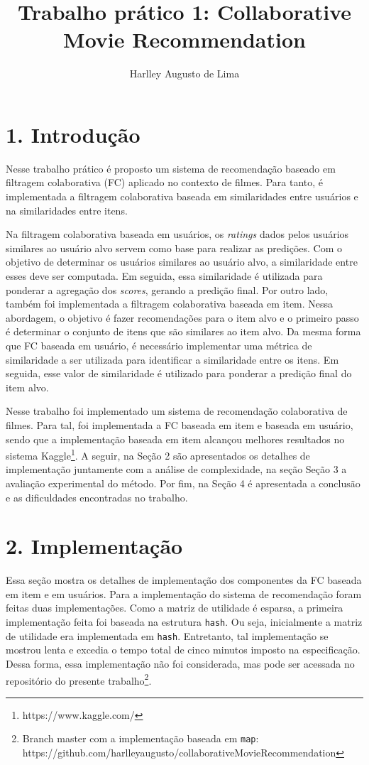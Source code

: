 \documentclass[brazil,a4paper,11pt]{article}
\title{Trabalho prático 1: Collaborative Movie Recommendation}
\author{Harlley Augusto de Lima}
\begin{document}
\maketitle

\section{1. Introdução}

Nesse trabalho prático é proposto um sistema de recomendação baseado em filtragem colaborativa (FC) aplicado no contexto de filmes. Para tanto, é implementada a filtragem colaborativa baseada em similaridades entre usuários e na similaridades entre itens. 

Na filtragem colaborativa baseada em usuários, os \textit{ratings} dados pelos usuários similares ao usuário alvo servem como base para realizar as predições. Com o objetivo de determinar os usuários similares ao usuário alvo, a similaridade entre esses deve ser computada. Em seguida, essa similaridade é utilizada para ponderar a agregação dos \textit{scores}, gerando a predição final. Por outro lado, também foi implementada a filtragem colaborativa baseada em item. Nessa abordagem, o objetivo é fazer recomendações para o item alvo e o primeiro passo é determinar o conjunto de itens que são similares ao item alvo. Da mesma forma que FC baseada em usuário, é necessário implementar uma métrica de similaridade a ser utilizada para identificar a similaridade entre os itens. Em seguida, esse valor de similaridade é utilizado para ponderar a predição final do item alvo.

Nesse trabalho foi implementado um sistema de recomendação colaborativa de filmes. Para tal, foi implementada a FC baseada em item e baseada em usuário, sendo que a implementação baseada em item alcançou melhores resultados no sistema Kaggle\footnote{https://www.kaggle.com/}. A seguir, na Seção 2 são apresentados os detalhes de implementação juntamente com a análise de complexidade, na seção Seção 3 a avaliação experimental do método. Por fim, na Seção 4 é apresentada a conclusão e as dificuldades encontradas no trabalho.

\section{2. Implementação}

Essa seção mostra os detalhes de implementação dos componentes da FC baseada em item e em usuários. Para a implementação do sistema de recomendação foram feitas duas implementações. Como a matriz de utilidade é esparsa, a primeira implementação feita foi baseada na estrutura \texttt{hash}. Ou seja, inicialmente a matriz de utilidade era implementada em \texttt{hash}. Entretanto, tal implementação se mostrou lenta e excedia o tempo total de cinco minutos imposto na especificação. Dessa forma, essa implementação não foi considerada, mas pode ser acessada no repositório do presente trabalho\footnote{Branch master com a implementação baseada em \texttt{map}:\\ https://github.com/harlleyaugusto/collaborativeMovieRecommendation}.
\end{document}
